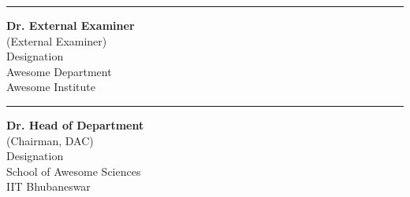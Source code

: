 \vspace*{15pt}
\begin{center}
\begin{minipage}{0.4\textwidth}
    \hrule\vspace{2ex}
    \begin{flushleft}
    {\small {\bfseries Dr. External Examiner}\\
    (External Examiner)\\
    Designation\\
    Awesome Department\\
    Awesome Institute}
    \end{flushleft}
\end{minipage}
\hfill
\begin{minipage}{0.4\textwidth}
    \begin{flushright}
    \hrule\vspace{2ex}
    {\small {\bfseries Dr. Head of Department}\\
    (Chairman, DAC)\\
    Designation\\
    School of Awesome Sciences\\
    IIT Bhubaneswar}
    \end{flushright}
\end{minipage}
\end{center}


\newpage
\thispagestyle{empty}
\null\newpage

